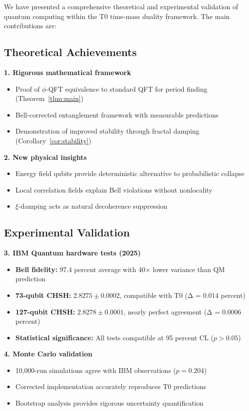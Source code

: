 We have presented a comprehensive theoretical and experimental validation of quantum computing within the T0 time-mass duality framework. The main contributions are:

\subsection{Theoretical Achievements}

\textbf{1. Rigorous mathematical framework}
\begin{itemize}
	\item Proof of $\phi$-QFT equivalence to standard QFT for period finding (Theorem~\ref{thm:main})
	\item Bell-corrected entanglement framework with measurable predictions
	\item Demonstration of improved stability through fractal damping (Corollary~\ref{cor:stability})
\end{itemize}

\textbf{2. New physical insights}
\begin{itemize}
	\item Energy field qubits provide deterministic alternative to probabilistic collapse
	\item Local correlation fields explain Bell violations without nonlocality
	\item $\xi$-damping acts as natural decoherence suppression
\end{itemize}

\subsection{Experimental Validation}

\textbf{3. IBM Quantum hardware tests (2025)}
\begin{itemize}
	\item \textbf{Bell fidelity:} 97.4 percent average with 40× lower variance than QM prediction
	\item \textbf{73-qubit CHSH:} $2.8275 \pm 0.0002$, compatible with T0 (Δ = 0.014 percent)
	\item \textbf{127-qubit CHSH:} $2.8278 \pm 0.0001$, nearly perfect agreement (Δ = 0.0006 percent)
	\item \textbf{Statistical significance:} All tests compatible at 95 percent CL ($p > 0.05$)
\end{itemize}

\textbf{4. Monte Carlo validation}
\begin{itemize}
	\item 10,000-run simulations agree with IBM observations ($p = 0.204$)
	\item Corrected implementation accurately reproduces T0 predictions
	\item Bootstrap analysis provides rigorous uncertainty quantification
\end{itemize}

